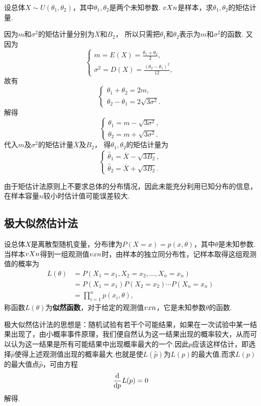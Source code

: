 \begin{example}
设总体\(X \sim U(\theta_1,\theta_2)\)，其中\(\theta_1,\theta_2\)是两个未知参数.
\(v{X}{n}\)是样本，求\(\theta_1,\theta_2\)的矩估计量.
\begin{solution}
因为\(m\)和\(\sigma^2\)的矩估计量分别为\(\overline{X}\)和\(B_2\)，%
所以只需把\(\theta_1\)和\(\theta_2\)表示为\(m\)和\(\sigma^2\)的函数.
又因为\[
\begin{cases}
m = E(X) = \frac{\theta_1+\theta_2}{2}, \\
\sigma^2 = D(X) = \frac{(\theta_2-\theta_1)^2}{12},
\end{cases}
\]故有\[
\begin{cases}
\theta_1+\theta_2 = 2m, \\
\theta_2-\theta_1 = 2 \sqrt{3\sigma^2}.
\end{cases}
\]解得\[
\begin{cases}
\theta_1 = m - \sqrt{3\sigma^2}, \\
\theta_2 = m + \sqrt{3\sigma^2}.
\end{cases}
\]
代入\(m\)及\(\sigma^2\)的矩估计量\(\overline{X}\)及\(B_2\)，%
得\(\theta_1,\theta_2\)的矩估计量为\[
\begin{cases}
\hat{\theta}_1 = \overline{X} - \sqrt{3 B_2}, \\
\hat{\theta}_2 = \overline{X} + \sqrt{3 B_2}.
\end{cases}
\]
\end{solution}
\end{example}

由于矩估计法原则上不要求总体的分布情况，因此未能充分利用已知分布的信息，在样本容量\(n\)较小时估计值可能误差较大.

\subsection{极大似然估计法}
设总体\(X\)是离散型随机变量，分布律为\(P(X=x)=p(x,\theta)\)，其中\(\theta\)是未知参数.当样本\(v{X}{n}\)得到一组观测值\(v{x}{n}\)时，由样本的独立同分布性，记样本取得这组观测值的概率为\begin{align*}
L(\theta)
&=P(X_1=x_1,X_2=x_2,\dotsc,X_n=x_n) \\
&=P(X_1=x_1) P(X_2=x_2) \dotsm P(X_n=x_n) \\
&=\prod_{i=1}^n{p(x_i,\theta)},
\end{align*}称函数\(L(\theta)\)为\textbf{似然函数}，对于给定的观测值\(v{x}{n}\)，它是未知参数\(\theta\)的函数.

极大似然估计法的思想是：随机试验有若干个可能结果，如果在一次试验中某一结果出现了，由小概率事件原理，我们便自然认为这一结果出现的概率较大，从而可以认为这一结果是所有可能结果中出现概率最大的一个.因此\(p\)应该这样估计，即选择\(\hat{p}\)使得上述观测值出现的概率最大.也就是使\(L(\hat{p})\)为\(L(p)\)的最大值.而求\(L(p)\)的最大值点\(\hat{p}\)，可由方程\[
\dv{p} L(p) = 0
\]解得.


